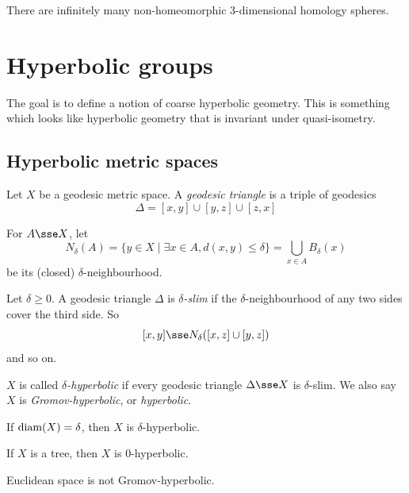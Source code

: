 \documentclass{article}
\begin{document}
\begin{theorem}
    [Dehn] There are infinitely many non-homeomorphic 3-dimensional homology spheres.
\end{theorem}

\section{Hyperbolic groups}

The goal is to define a notion of coarse hyperbolic geometry. This is something which looks like hyperbolic geometry that is invariant under quasi-isometry.

\subsection{Hyperbolic metric spaces}

Let \(X\) be a geodesic metric space. A \emph{geodesic triangle} is a triple of geodesics
\[\Delta = [x, y] \cup [y, z] \cup [z, x]\]

For \(A \sse X\), let
\[N_\delta(A) = \{y \in X \mid \exists x \in A, d(x, y) \le \delta\} = \bigcup_{x \in A}B_\delta(x)\]
be its (closed) \(\delta\)-neighbourhood.

\begin{definition}
    Let \(\delta \ge 0\). A geodesic triangle \(\Delta\) is \emph{\(\delta\)-slim} if the \(\delta\)-neighbourhood of any two sides cover the third side. So
    \[[x, y] \sse N_\delta([x, z] \cup [y, z])\]
    and so on.
\end{definition}

\begin{definition}
    \(X\) is called \emph{\(\delta\)-hyperbolic} if every geodesic triangle \(\Delta \sse X\) is \(\delta\)-slim. We also say \(X\) is \emph{Gromov-hyperbolic}, or \emph{hyperbolic}.
\end{definition}

\begin{example}
    If \(\operatorname{diam}(X) = \delta\), then \(X\) is \(\delta\)-hyperbolic.
\end{example}

\begin{example}
    If \(X\) is a tree, then \(X\) is \(0\)-hyperbolic.
\end{example}

\begin{example}
    Euclidean space is not Gromov-hyperbolic.
\end{example}
\end{document}
